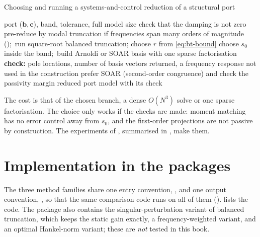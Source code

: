 \begin{algbox}{Choosing and running a systems-and-control reduction of a structural port}
\begin{pseudo}
\Require port ($\bm b,\bm c$), band, tolerance, full model size
\State check that the damping is not zero 
  \State pre-reduce by modal truncation if frequencies span many orders of magnitude ();\ run square-root balanced truncation; choose $r$ from \eqref{eq:bt-bound}
\Else
  \State choose $s_0$ inside the band;\ build Arnoldi or SOAR basis with one sparse factorisation
\EndIf
\State \textbf{check:} pole locations, number of basis vectors returned, a frequency response not used in the construction
  \State prefer SOAR (second-order congruence) and check the passivity margin
\EndIf
\Ensure reduced port model with its check
\end{pseudo}
\end{algbox}

The cost is that of the chosen branch, a dense $O(N^3)$ solve or one sparse factorisation. The choice only works if the checks are made: moment matching has no error control away from $s_0$, and the first-order projections are not passive by construction. The experiments of , summarised in , make them.

\section{Implementation in the packages}\label{sec:bt-impl}

The three method families share one entry convention, , and one output convention, , so that the same comparison code runs on all of them ().  lists the code. The package also contains the singular-perturbation variant of balanced truncation, which keeps the static gain exactly, a frequency-weighted variant, and an optimal Hankel-norm variant; these are \emph{not} tested in this book.


